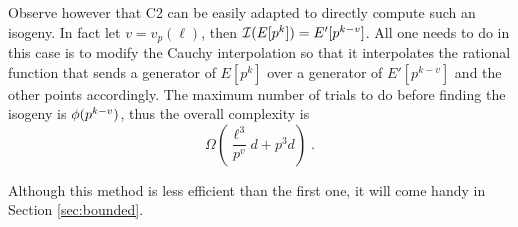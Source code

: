 Observe however that C2 can be easily adapted to directly compute such
an isogeny. In fact let $v=v_p(\ell)$, then $\mathcal{I}(E[p^k]) =
E'[p^{k-v}]$. All one needs to do in this case is to modify the Cauchy
interpolation so that it interpolates the rational function that sends
a generator of $E[p^k]$ over a generator of $E'[p^{k-v}]$ and the
other points accordingly. The maximum number of trials to do before
finding the isogeny is $\phi(p^{k-v})$, thus the overall complexity
is
\begin{equation}
  \label{eq:C2:complexity-non-prime}
  \Omega\left(\frac{\ell^3}{p^v}d + p^3d\right)
  \;\text{.}
\end{equation}

Although this method is less efficient than the first one, it will
come handy in Section \ref{sec:bounded}.



%
